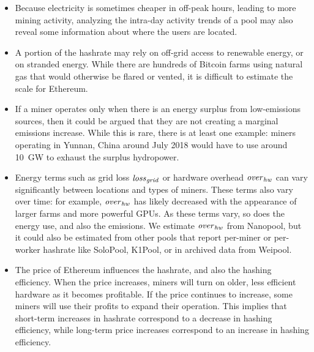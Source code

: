\begin{itemize}
    \item Because electricity is sometimes cheaper in off-peak hours, leading to more mining activity, analyzing the intra-day activity trends of a pool may also reveal some information about where the users are located.
    
    \item A portion of the hashrate may rely on off-grid access to renewable energy, or on stranded energy. While there are hundreds\cite{sigalos_bitcoin_2021} of Bitcoin farms using natural gas that would otherwise be flared or vented, it is difficult to estimate the scale for Ethereum.
    
    \item If a miner operates only when there is an energy surplus from low-emissions sources, then it could be argued that they are not creating a marginal emissions increase. While this is rare, there is at least one example: miners operating in Yunnan, China around July 2018 would have to use around \SI{10}{\giga\watt} to exhaust the surplus hydropower\cite{liu_china_2021}.
    
    \item Energy terms such as grid loss $\mathit{loss}_\mathit{grid}$ or hardware overhead $\mathit{over}_\mathit{hw}$ can vary significantly between locations and types of miners. These terms also vary over time: for example, $\mathit{over}_\mathit{hw}$ has likely decreased with the appearance of larger farms and more powerful GPUs. As these terms vary, so does the energy use, and also the emissions. We estimate $\mathit{over}_\mathit{hw}$ from Nanopool, but it could also be estimated from other pools that report per-miner or per-worker hashrate like SoloPool\cite{solopool_ethereum_2021}, K1Pool\cite{k1_pool_ethereum_2021}, or in archived data from Weipool\cite{weipool_weipool_2016}.
    
    \item The price of Ethereum influences the hashrate, and also the hashing efficiency. When the price increases, miners will turn on older, less efficient hardware as it becomes profitable. If the price continues to increase, some miners will use their profits to expand their operation. This implies that short-term increases in hashrate correspond to a decrease in hashing efficiency, while long-term price increases correspond to an increase in hashing efficiency.
    

\end{itemize}
